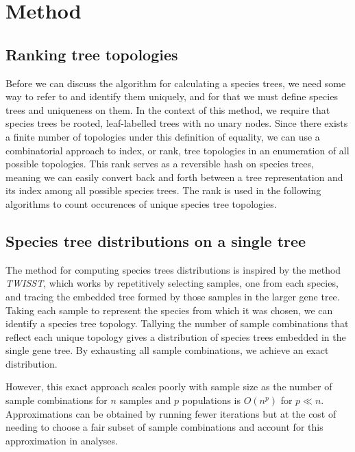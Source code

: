 \documentclass{article}
\newcommand{\twisst}{{\textit{TWISST}}}
\begin{document}
\section{Method}
\subsection{Ranking tree topologies}

Before we can discuss the algorithm for calculating a species trees, we
need some way to refer to and identify them uniquely, and for that we must
define species trees and uniqueness on them. In the context of this method,
we require that species trees be rooted, leaf-labelled trees with no
unary nodes.
Since there exists a finite number of topologies under this definition
of equality, we can use a combinatorial approach to index, or rank,
tree topologies in an enumeration of all possible topologies.
This rank serves as a reversible hash on species trees, meaning we can
easily convert back and forth between a tree representation and its
index among all possible species trees. The rank is used in the following
algorithms to count occurences of unique species tree topologies.

\subsection{Species tree distributions on a single tree}

The method for computing species trees distributions is inspired by the method
\twisst, which works
by repetitively selecting samples, one from each species, and tracing the
embedded tree formed by those samples in the larger gene tree. Taking each
sample to represent the species from which it was chosen, we can identify
a species tree topology. Tallying the number of sample combinations that
reflect each unique topology gives a distribution of species trees
embedded in the single gene tree. By exhausting all sample combinations,
we achieve an exact distribution.

However, this exact approach scales poorly with sample size as the number
of sample combinations for $n$ samples and $p$ populations is $O(n^p)$ for
$p \ll n$. Approximations can be obtained by running fewer iterations but
at the cost of needing to choose a fair subset of sample combinations and
account for this approximation in analyses.
\end{document}
